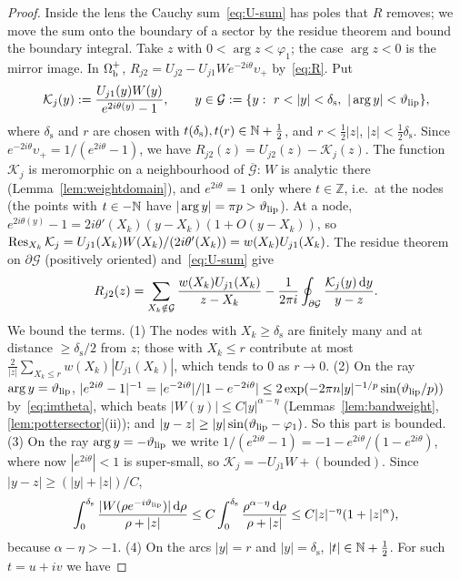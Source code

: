 \begin{proof}
Inside the lens the Cauchy sum~\eqref{eq:U-sum} has poles that $R$ removes; we move the sum onto the boundary of a
sector by the residue theorem and bound the boundary integral. Take $z$ with $0<\arg z<\varphi_1$; the case $\arg z<0$ is the mirror image. In $\Omega_{\mathrm{b}}^+$, $R_{j2}=U_{j2}-U_{j1}We^{-2i\theta}\upsilon_+$
by~\eqref{eq:R}. Put
\[
  \mathcal K_j(y):=\frac{U_{j1}(y)W(y)}{e^{2i\theta(y)}-1},\qquad y\in\mathcal G:=\{y:\ r<|y|<\delta_{\mathrm s},\ |\arg y|<\thlip\},
\]
where $\delta_{\mathrm s}$ and $r$ are chosen with $t(\delta_{\mathrm s}),t(r)\in\mathbb{N}+\frac12$, and $r<\frac12|z|$, $|z|<\frac12\delta_{\mathrm s}$. Since
$e^{-2i\theta}\upsilon_+=1/(e^{2i\theta}-1)$, we have $R_{j2}(z)=U_{j2}(z)-\mathcal K_j(z)$. The function $\mathcal K_j$ is meromorphic on a neighbourhood of $\overline{\mathcal G}$: $W$ is
analytic there (Lemma~\ref{lem:weightdomain}), and $e^{2i\theta}=1$ only where $t\in\mathbb Z$, i.e.\ at the nodes (the points with
$t\in-\mathbb{N}$ have $|\arg y|=\pi p>\vartheta_{\mathrm{lip}}$). At a node, $e^{2i\theta(y)}-1=2i\theta'(X_k)(y-X_k)(1+O(y-X_k))$, so
$\operatorname*{Res}_{X_k}\mathcal K_j=U_{j1}(X_k)W(X_k)/(2i\theta'(X_k))=w(X_k)U_{j1}(X_k)$. The residue theorem on $\partial\mathcal G$ (positively
oriented) and~\eqref{eq:U-sum} give
\begin{equation}\label{eq:R-contour}
  R_{j2}(z)=\sum_{X_k\notin\mathcal G}\frac{w(X_k)U_{j1}(X_k)}{z-X_k}-\frac1{2\pi i}\oint_{\partial\mathcal G}\frac{\mathcal K_j(y)\,\mathrm{d} y}{y-z}.
\end{equation}
We bound the terms. (1) The nodes with $X_k\ge\delta_{\mathrm s}$ are finitely many and at distance $\ge\delta_{\mathrm s}/2$ from $z$; those with $X_k\le r$
contribute at most $\frac2{|z|}\sum_{X_k\le r}w(X_k)|U_{j1}(X_k)|$, which tends to $0$ as $r\to0$. (2) On the ray
$\arg y=\vartheta_{\mathrm{lip}}$, $|e^{2i\theta}-1|^{-1}=|e^{-2i\theta}|/|1-e^{-2i\theta}|\le2\exp(-2\pi n|y|^{-1/p}\sin(\vartheta_{\mathrm{lip}}/p))$ by~\eqref{eq:imtheta},
which beats $|W(y)|\le C|y|^{\alpha-\eta}$ (Lemmas~\ref{lem:bandweight}, \ref{lem:pottersector}(ii)); and $|y-z|\ge|y|\sin(\vartheta_{\mathrm{lip}}-\varphi_1)$.
So this part is bounded. (3) On the ray $\arg y=-\vartheta_{\mathrm{lip}}$ we write $1/(e^{2i\theta}-1)=-1-e^{2i\theta}/(1-e^{2i\theta})$, where now
$|e^{2i\theta}|<1$ is super-small, so $\mathcal K_j=-U_{j1}W+(\text{bounded})$. Since $|y-z|\ge(|y|+|z|)/C$,
\[
  \int_0^{\delta_{\mathrm s}}\frac{|W(\rho e^{-i\vartheta_{\mathrm{lip}}})|\,\mathrm{d}\rho}{\rho+|z|}\le C\int_0^{\delta_{\mathrm s}}\frac{\rho^{\alpha-\eta}\,\mathrm{d}\rho}{\rho+|z|}\le C|z|^{-\eta}(1+|z|^{\alpha}),
\]
because $\alpha-\eta>-1$. (4) On the arcs $|y|=r$ and $|y|=\delta_{\mathrm s}$, $|t|\in\mathbb{N}+\frac12$. For such $t=u+iv$ we have

\end{proof}
